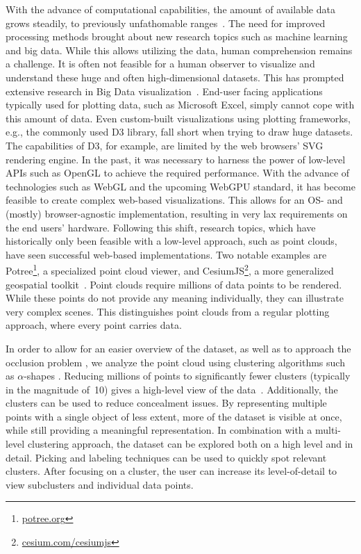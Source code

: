 \documentclass[sigconf]{acmart}
\begin{document}
With the advance of computational capabilities, the amount of available data grows steadily, to previously unfathomable ranges~\cite{ridiculousstoragesilos}. 
The need for improved processing methods brought about new research topics such as machine learning and big data. 
While this allows utilizing the data, human comprehension remains a challenge. 
It is often not feasible for a human observer to visualize and understand these huge and often high-dimensional datasets.
This has prompted extensive research in Big Data visualization~\cite{visExpLargeData,interactivebigdatavis,po2020linked}.
End-user facing applications typically used for plotting data, such as Microsoft Excel, simply cannot cope with this amount of data. 
Even custom-built visualizations using plotting frameworks, e.g., the commonly used D3 library, fall short when trying to draw huge datasets.
The capabilities of D3, for example, are limited by the web browsers' SVG rendering engine. 
In the past, it was necessary to harness the power of low-level APIs such as OpenGL to achieve the required performance. 
With the advance of technologies such as WebGL and the upcoming WebGPU standard, it has become feasible to create complex web-based visualizations. 
This allows for an OS- and (mostly) browser-agnostic implementation, resulting in very lax requirements on the end users' hardware.
Following this shift, research topics, which have historically only been feasible with a low-level approach, such as point clouds, have seen successful web-based implementations. Two notable examples are Potree\footnote{\href{http://potree.org/}{potree.org}}, a specialized point cloud viewer, and CesiumJS\footnote{\href{https://cesium.com/cesiumjs/}{cesium.com/cesiumjs}}, a more generalized geospatial toolkit~\cite{potree,cesiumpoints}.
Point clouds require millions of data points to be rendered.
While these points do not provide any meaning individually, they can illustrate very complex scenes.
This distinguishes point clouds from a regular plotting approach, where every point carries data.

In order to allow for an easier overview of the dataset, as well as to approach the occlusion problem \cite{occlusion}, we analyze the point cloud using clustering algorithms such as $\alpha$-shapes \cite{alphaclusters}.
Reducing millions of points to significantly fewer clusters (typically in the magnitude of~10) gives a high-level view of the data~\cite{multidimclusters}.
Additionally, the clusters can be used to reduce concealment issues.
By representing multiple points with a single object of less extent, more of the dataset is visible at once, while still providing a meaningful representation.
In combination with a multi-level clustering approach, the dataset can be explored both on a high level and in detail.
Picking and labeling techniques can be used to quickly spot relevant clusters.
After focusing on a cluster, the user can increase its level-of-detail to view subclusters and individual data points.
\end{document}
